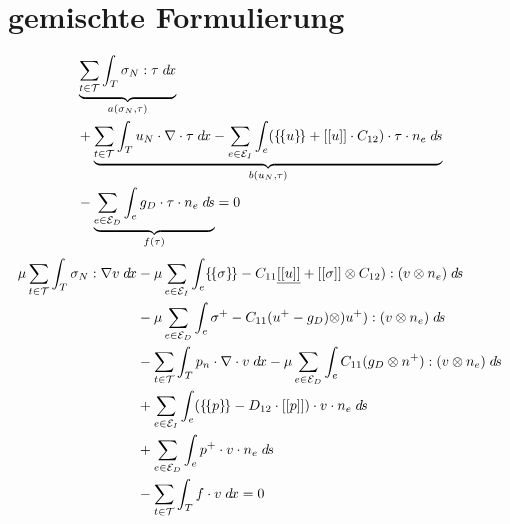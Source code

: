 \section{gemischte Formulierung}\label{sec:gem_form}
    \begin{align}
        &\underbrace{\sum_{t\in\mathcal{T}} \int_T \sigma_N : \tau \;d\hspace{-1.25pt} x}_{a(\sigma_N,\tau)} \notag \\
                &+ \underbrace{\sum_{t\in\mathcal{T}} \int_T u_N \cdot \nabla \cdot \tau \;d\hspace{-1.25pt} x 
        - \sum_{e\in\mathcal{E}_I} \int_e (\{\hspace{-1.25pt}\{ u \}\hspace{-1.25pt}\} + [[ u ]] \cdot C_{12}) \cdot \tau \cdot n_e \;d\hspace{-1.25pt} s }_{b(u_N,\tau)} \notag \\
        &- \underbrace{\sum_{e\in\mathcal{E}_D} \int_e g_D \cdot \tau \cdot n_e \;d\hspace{-1.25pt} s}_{f(\tau)} = 0
    \end{align}
    \begin{align}
        \mu \sum_{t\in\mathcal{T}} \int_T \sigma_N : \nabla v \;d\hspace{-1.25pt} x
            &- \mu \sum_{e\in\mathcal{E}_I} \int_e \{\hspace{-1.25pt}\{ \sigma \}\hspace{-1.25pt}\} - C_{11} \underline{[[ u ]]} + [[ \sigma ]] \otimes C_{12}) : (v \otimes n_e) \;d\hspace{-1.25pt} s \notag \\
        &- \mu \sum_{e\in\mathcal{E}_D} \int_e \sigma^+ - C_{11} ( u^+ - g_D) \otimes) u^+ ) : ( v \otimes n_e ) \;d\hspace{-1.25pt} s \notag \\
        &- \sum_{t\in\mathcal{T}} \int_T p_n \cdot \nabla \cdot v \;d\hspace{-1.25pt} x - \mu \sum_{e\in\mathcal{E}_D} \int_e C_{11} (g_D \otimes n^+): (v \otimes n_e) \;d\hspace{-1.25pt} s \notag \\
           &+ \sum_{e\in\mathcal{E}_I} \int_e ( \{\hspace{-1.25pt}\{ p \}\hspace{-1.25pt}\} - D_{12} \cdot [[ p ]]) \cdot v \cdot n_e \;d\hspace{-1.25pt} s \notag \\
           &+ \sum_{e\in\mathcal{E}_D} \int_e p^+ \cdot v \cdot n_e \;d\hspace{-1.25pt} s \notag \\
           &- \sum_{t\in\mathcal{T}} \int_T f \cdot v \;d\hspace{-1.25pt} x = 0
    \end{align}

